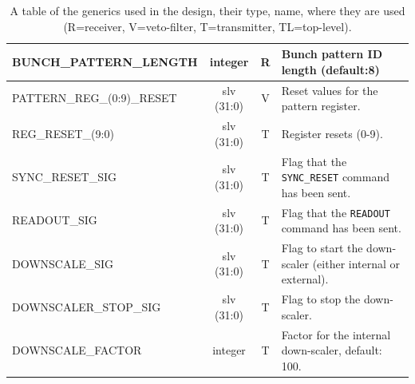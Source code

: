 \begin{table}[htbp]
\begin{center}
\begin{tabulary}{\textwidth}{l| c | c | L}
      BUNCH\_PATTERN\_LENGTH     & integer    &  R              & Bunch pattern ID length (default:8) \\
      \hline                                                    
      PATTERN\_REG\_(0:9)\_RESET & slv (31:0) &  V              & Reset values for the pattern register.\\
      \hline                                                    
      REG\_RESET\_(9:0)          & slv (31:0) &  T              & Register resets (0-9). \\
      SYNC\_RESET\_SIG           & slv (31:0) &  T              & Flag that the \texttt{SYNC\_RESET} command has been sent.   \\
      READOUT\_SIG               & slv (31:0) &  T              & Flag that the \texttt{READOUT} command has been sent.       \\
      DOWNSCALE\_SIG             & slv (31:0) &  T              & Flag to start the down-scaler (either internal or external).\\
      DOWNSCALER\_STOP\_SIG      & slv (31:0) &  T              & Flag to stop the down-scaler.                               \\
      DOWNSCALE\_FACTOR          & integer    &  T              & Factor for the internal down-scaler, default: 100.          \\
    \end{tabulary}
  \end{center}
  \caption{A table of the generics used in the design, their type, name, where they are used (R=receiver, V=veto-filter, T=transmitter, TL=top-level).}
  \label{tab:all_generics}
\end{table}

